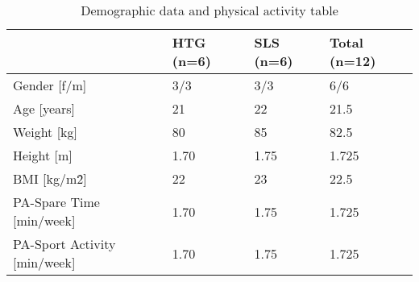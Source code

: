\newcommand\tr{\rule{0pt}{3.5ex}}
\newcommand\br{\rule[-2ex]{0pt}{3ex}}
\begin{table}[h!]
\centering
{}
\renewcommand{\arraystretch}{1}
\begin{tabular}{ m{5.6cm} m{2.1cm} m{2.1cm} m{2.1cm}}
\rowcolor{tableheadergray} & \tr HTG (n=6) \br & \tr SLS (n=6) \br & \tr Total (n=12) \br \\
\hline
Gender [f/m]						& 3/3 & 3/3 & 6/6 \\
\hline
Age [years] 						& 21 & 22 & 21.5 \\
\hline
Weight [kg] 						& 80 & 85 & 82.5 \\
\hline
Height [m] 							& 1.70 & 1.75 & 1.725 \\
\hline
BMI [kg/m\^2] 					& 22 & 23 & 22.5 \\
\hline
PA-Spare Time [min/week]		& 1.70 & 1.75 & 1.725 \\
\hline
PA-Sport Activity [min/week]	& 1.70 & 1.75 & 1.725 \\
\end{tabular}
\caption{Demographic data and physical activity table}
\label{table:1}
\end{table}
